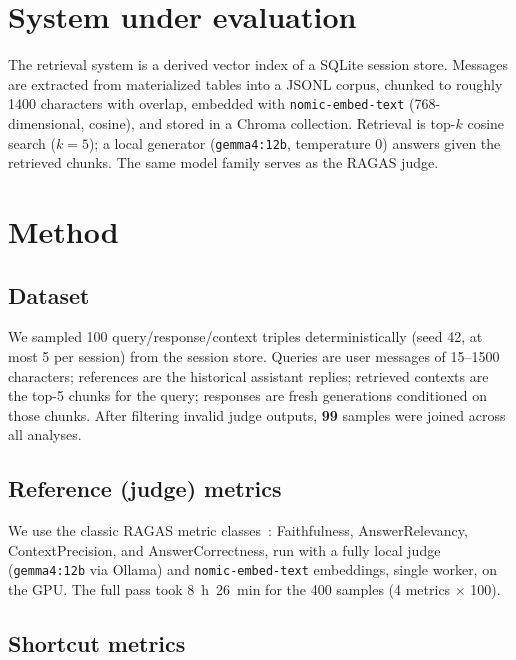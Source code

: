 \documentclass[11pt]{article}
\begin{document}
\section{System under evaluation}\label{sec:system}

The retrieval system is a derived vector index of a SQLite session store.
Messages are extracted from materialized tables into a JSONL corpus, chunked
to roughly 1400 characters with overlap, embedded with
\texttt{nomic-embed-text} (768-dimensional, cosine), and stored in a Chroma
collection. Retrieval is top-$k$ cosine search ($k=5$); a local generator
(\texttt{gemma4:12b}, temperature $0$) answers given the retrieved chunks.
The same model family serves as the RAGAS judge.

\section{Method}\label{sec:method}

\subsection{Dataset}\label{sec:dataset}

We sampled 100 query/response/context triples deterministically (seed 42,
at most 5 per session) from the session store. Queries are user messages of
15--1500 characters; references are the historical assistant replies;
retrieved contexts are the top-5 chunks for the query; responses are fresh
generations conditioned on those chunks. After filtering invalid judge
outputs, \textbf{99} samples were joined across all analyses.

\subsection{Reference (judge) metrics}\label{sec:ragas}

We use the classic RAGAS metric classes~\cite{es2023ragas}: Faithfulness,
AnswerRelevancy, ContextPrecision, and AnswerCorrectness, run with a fully
local judge (\texttt{gemma4:12b} via Ollama) and \texttt{nomic-embed-text}
embeddings, single worker, on the GPU. The full pass took 8~h~26~min for the
400 samples (4 metrics $\times$ 100).

\subsection{Shortcut metrics}\label{sec:shortcuts}
\end{document}

